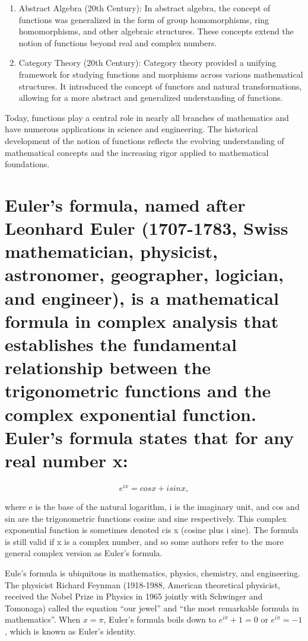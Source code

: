 \documentclass{article}
\begin{document}
\begin{enumerate}
  \item Abstract Algebra (20th Century): In abstract algebra, the concept of functions was generalized in the form of group homomorphisms, ring homomorphisms, and other algebraic structures. These concepts extend the notion of functions beyond real and complex numbers.
  \item Category Theory (20th Century): Category theory provided a unifying framework for studying functions and morphisms across various mathematical structures. It introduced the concept of functors and natural transformations, allowing for a more abstract and generalized understanding of functions.
\end{enumerate}

Today, functions play a central role in nearly all branches of mathematics and have numerous applications in science and engineering. The historical development of the notion of functions reflects the evolving understanding of mathematical concepts and the increasing rigor applied to mathematical foundations.


\section{Euler's formula, named after Leonhard Euler (1707-1783, Swiss mathematician, physicist, astronomer, geographer, logician, and engineer), is a mathematical formula in complex analysis that establishes the fundamental relationship between the trigonometric functions and the complex exponential function. Euler's formula states that for any real number x:}

\begin{equation*}
  e^{ix} = cos x + i sin x,
\end{equation*}

where e is the base of the natural logarithm, i is the imaginary unit, and cos and sin are the trigonometric functions cosine and sine respectively. This complex exponential function is sometimes denoted cis x (cosine plus i sine). The formula is still valid if x is a complex number, and so some authors refer to the more general complex version as Euler's formula.

Eule's formula is ubiquitous in mathematics, physics, chemistry, and engineering. The physicist Richard Feynman (1918-1988, American theoretical physicist, received the Nobel Prize in Physics in 1965 jointly with Schwinger and Tomonaga) called the equation “our jewel” and “the most remarkable formula in mathematics”. When $x = \pi$, Euler's formula boils down to $e^{i\pi} + 1 = 0$ or $e^{i\pi} = -1$, which is known as Euler's identity.
\end{document}
